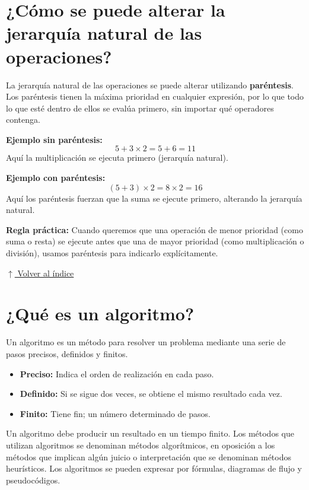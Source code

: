 \documentclass[12pt]{article}
\newcommand{\volverindice}{%
    \vspace{1em}%
    \begin{flushright}%
        \hyperlink{indice}{\small $\uparrow$ Volver al índice}%
    \end{flushright}%
}
\begin{document}

\section{¿Cómo se puede alterar la jerarquía natural de las operaciones?}

La jerarquía natural de las operaciones se puede alterar utilizando \textbf{paréntesis}. Los paréntesis tienen la máxima prioridad en cualquier expresión, por lo que todo lo que esté dentro de ellos se evalúa primero, sin importar qué operadores contenga.

\textbf{Ejemplo sin paréntesis:}
\[
5 + 3 \times 2 = 5 + 6 = 11
\]
Aquí la multiplicación se ejecuta primero (jerarquía natural).

\textbf{Ejemplo con paréntesis:}
\[
(5 + 3) \times 2 = 8 \times 2 = 16
\]
Aquí los paréntesis fuerzan que la suma se ejecute primero, alterando la jerarquía natural.

\textbf{Regla práctica:} Cuando queremos que una operación de menor prioridad (como suma o resta) se ejecute antes que una de mayor prioridad (como multiplicación o división), usamos paréntesis para indicarlo explícitamente.

\volverindice
\newpage


\section{¿Qué es un algoritmo?}

Un algoritmo es un método para resolver un problema mediante una serie de pasos precisos, definidos y finitos.

\begin{itemize}
    \item \textbf{Preciso:} Indica el orden de realización en cada paso.
    \item \textbf{Definido:} Si se sigue dos veces, se obtiene el mismo resultado cada vez.
    \item \textbf{Finito:} Tiene fin; un número determinado de pasos.
\end{itemize}

Un algoritmo debe producir un resultado en un tiempo finito. Los métodos que utilizan algoritmos se denominan métodos algorítmicos, en oposición a los métodos que implican algún juicio o interpretación que se denominan métodos heurísticos. Los algoritmos se pueden expresar por fórmulas, diagramas de flujo y pseudocódigos.
\end{document}
